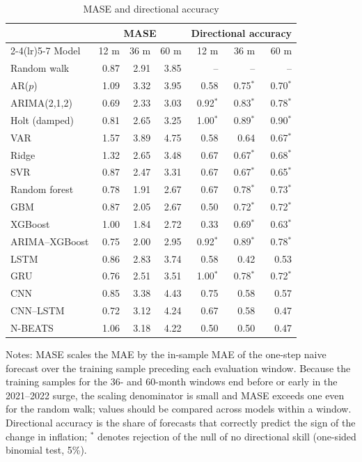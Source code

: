 \begin{table}[!ht]\centering\small\caption{MASE and directional accuracy}\label{tab:mase}
\begin{tabular}{l rrr rrr}\toprule
 & \multicolumn{3}{c}{MASE} & \multicolumn{3}{c}{Directional accuracy}\\\cmidrule(lr){2-4}\cmidrule(lr){5-7}
Model & 12 m & 36 m & 60 m & 12 m & 36 m & 60 m\\\midrule
Random walk & 0.87 & 2.91 & 3.85 & -- & -- & --\\
AR($p$) & 1.09 & 3.32 & 3.95 & 0.58 & 0.75$^{*}$ & 0.70$^{*}$\\
ARIMA(2,1,2) & 0.69 & 2.33 & 3.03 & 0.92$^{*}$ & 0.83$^{*}$ & 0.78$^{*}$\\
Holt (damped) & 0.81 & 2.65 & 3.25 & 1.00$^{*}$ & 0.89$^{*}$ & 0.90$^{*}$\\
VAR & 1.57 & 3.89 & 4.75 & 0.58 & 0.64 & 0.67$^{*}$\\
Ridge & 1.32 & 2.65 & 3.48 & 0.67 & 0.67$^{*}$ & 0.68$^{*}$\\
SVR & 0.87 & 2.47 & 3.31 & 0.67 & 0.67$^{*}$ & 0.65$^{*}$\\
Random forest & 0.78 & 1.91 & 2.67 & 0.67 & 0.78$^{*}$ & 0.73$^{*}$\\
GBM & 0.87 & 2.05 & 2.67 & 0.50 & 0.72$^{*}$ & 0.72$^{*}$\\
XGBoost & 1.00 & 1.84 & 2.72 & 0.33 & 0.69$^{*}$ & 0.63$^{*}$\\
ARIMA--XGBoost & 0.75 & 2.00 & 2.95 & 0.92$^{*}$ & 0.89$^{*}$ & 0.78$^{*}$\\
LSTM & 0.86 & 2.83 & 3.74 & 0.58 & 0.42 & 0.53\\
GRU & 0.76 & 2.51 & 3.51 & 1.00$^{*}$ & 0.78$^{*}$ & 0.72$^{*}$\\
CNN & 0.85 & 3.38 & 4.43 & 0.75 & 0.58 & 0.57\\
CNN--LSTM & 0.72 & 3.12 & 4.24 & 0.67 & 0.58 & 0.47\\
N-BEATS & 1.06 & 3.18 & 4.22 & 0.50 & 0.50 & 0.47\\
\bottomrule\end{tabular}
\begin{minipage}{0.95\linewidth}\footnotesize\vspace{2pt} Notes: MASE scales the MAE by the in-sample MAE of the one-step naive forecast over the training sample preceding each evaluation window. Because the training samples for the 36- and 60-month windows end before or early in the 2021--2022 surge, the scaling denominator is small and MASE exceeds one even for the random walk; values should be compared across models within a window. Directional accuracy is the share of forecasts that correctly predict the sign of the change in inflation; $^{*}$ denotes rejection of the null of no directional skill (one-sided binomial test, 5\%).\end{minipage}
\end{table}